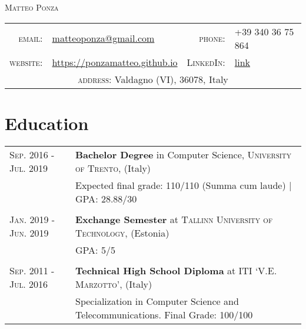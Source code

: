\documentclass[a4paper,11pt]{article}
\begin{document}
\pagestyle{empty} %
\par{\centering
		{\Huge \textsc{Matteo Ponza}
	}\par}
\begin{center}
\begin{tabular}{rlrl}
  \textsc{email:}     & \href{mailto:matteoponza@gmail.com}{matteoponza@gmail.com} &
  \textsc{phone:}     & +39 340 36 75 864\\
  \textsc{website:}   & \href{https://ponzamatteo.github.io/}{https://ponzamatteo.github.io} & \textsc{LinkedIn:} & \href{https://www.linkedin.com/in/matteo-ponza-557136135}{link}\\
  \multicolumn{4}{c}{\textsc{address:} \quad Valdagno (VI), 36078, Italy} \\
\end{tabular}
\end{center}

\section{Education}
\begin{tabular}{m{0.225\linewidth}|p{0.775\linewidth}}
  \textsc{Sep. 2016 - Jul. 2019} &
  \textbf{Bachelor Degree} in Computer Science,
  \textsc{University of Trento}, (Italy)\\
  & Expected final grade: 110/110 (Summa cum laude) | \textsc{GPA}: 28.88/30\\
  \multicolumn{2}{c}{} \\

  \textsc{Jan. 2019 - Jun. 2019}& 
  \textbf{Exchange Semester} at \textsc{Tallinn University of Technology}, (Estonia)\\& GPA: 5/5 \\

  \multicolumn{2}{c}{} \\
  \textsc{Sep. 2011 - Jul. 2016} &
  \textbf{Technical High School Diploma} at \textsc{ITI ‘V.E. Marzotto’}, (Italy)
\\ & Specialization in Computer Science and Telecommunications. Final Grade: 100/100
\end{tabular}
\end{document}
